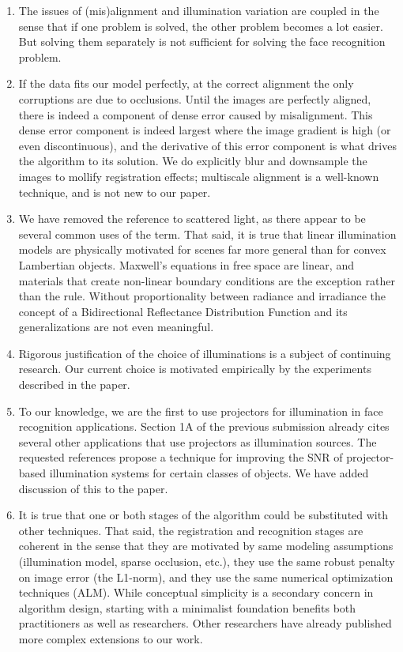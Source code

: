 \documentclass[11pt]{article}
\begin{document}
\begin{enumerate}
\item The issues of (mis)alignment and illumination variation are coupled in the
sense that if one problem is solved, the other problem becomes a lot easier. But solving them
separately is not sufficient for solving the face recognition problem.

\item If the data fits our model perfectly, at the correct alignment the only
corruptions are due to occlusions.  Until the images are perfectly aligned,
there is indeed a component of dense error caused by misalignment.  This dense
error component is indeed largest where the image gradient is high (or even
discontinuous), and the derivative of this error component is what drives the
algorithm to its solution.  We do explicitly  blur and downsample the images to
mollify registration effects; multiscale alignment is a well-known technique,
and is not new to our paper.

\item We have removed the reference to scattered light, as there appear to
be several common uses of the term.  That said, it is true that linear illumination
models are physically motivated for scenes far more general than for convex
Lambertian objects.  Maxwell's equations in free space are linear, and materials
that create non-linear boundary conditions are the exception
rather than the rule.  Without proportionality between radiance and irradiance
the concept of a Bidirectional Reflectance Distribution Function and its
generalizations are not even meaningful.

\item Rigorous justification of the choice of illuminations is a subject of
continuing research.  Our current choice is motivated empirically by the
experiments described in the paper.

\item To our knowledge, we are the first to use projectors for illumination in
face recognition applications.  Section 1A of the previous submission already
cites several other applications that use projectors as illumination sources.
The requested references propose a technique for improving the SNR of projector-based
illumination systems for certain classes of objects.  We have added
discussion of this to the paper.

\item  It is true that one or both stages of the algorithm could be substituted
with other techniques.  That said, the registration and recognition stages are
coherent in the sense that they are motivated by same modeling assumptions
(illumination model, sparse occlusion, etc.), they use the same robust penalty
on image error (the L1-norm), and they use the same numerical optimization
techniques (ALM).  While conceptual simplicity is a secondary concern in
algorithm design, starting with a minimalist foundation benefits both
practitioners as well as researchers.  Other researchers have already published
more complex extensions to our work.


\end{enumerate}
\end{document}
